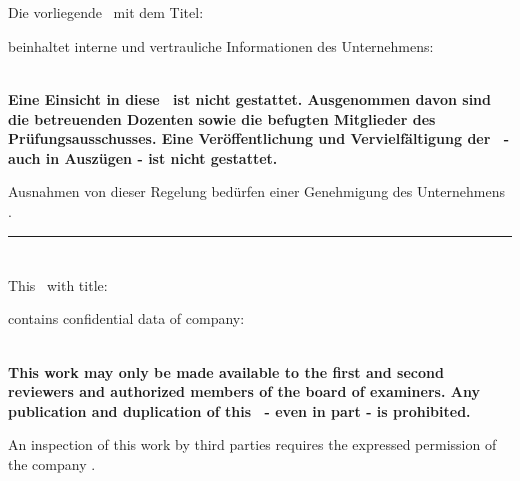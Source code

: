
\section*{}

Die vorliegende \thesistype \ mit dem Titel:
\begin{center}
	\textit{\thesistitle}
\end{center}
beinhaltet interne und vertrauliche Informationen des Unternehmens:
\begin{center}
	\textit{\companyname}
\end{center}

\textbf{\\
Eine Einsicht in diese \thesistype \ ist nicht gestattet. Ausgenommen davon sind die betreuenden Dozenten sowie die befugten Mitglieder des Prüfungsausschusses. Eine Veröffentlichung und Vervielfältigung der \thesistype \ - auch in Auszügen - ist nicht gestattet.
}

Ausnahmen von dieser Regelung bedürfen einer Genehmigung des Unternehmens \textit{\companyname}.

\rule{\textwidth}{0.4pt}


\section*{}

This \thesistypeenglish \ with title:
\begin{center}
	\textit{\thesistitle}
\end{center}
contains confidential data of company:
\begin{center}
	\textit{\companyname}
\end{center}

\textbf{\\
This work may only be made available to the first and second reviewers and authorized members of the board of examiners. Any publication and duplication of this \thesistypeenglish \ - even in part - is prohibited.
}

An inspection of this work by third parties requires the expressed permission of the company \textit{\companyname}.

